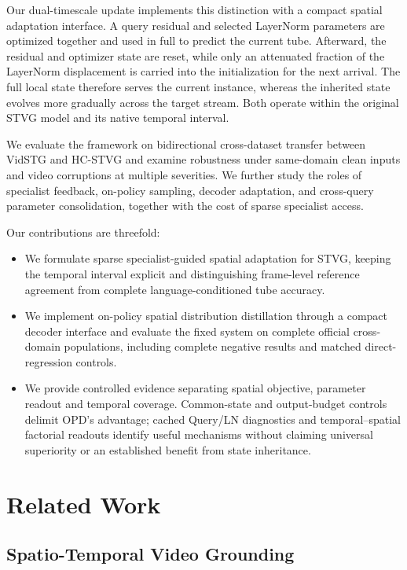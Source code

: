 \documentclass[10pt,twocolumn,letterpaper]{article}
\begin{document}
Our dual-timescale update implements this distinction with a compact
spatial adaptation interface. A query residual and selected LayerNorm
parameters are optimized together and used in full to predict the
current tube. Afterward, the residual and optimizer state are reset,
while only an attenuated fraction of the LayerNorm displacement is
carried into the initialization for the next arrival. The full local
state therefore serves the current instance, whereas the inherited
state evolves more gradually across the target stream. Both operate
within the original STVG model and its native temporal interval.

We evaluate the framework on bidirectional cross-dataset transfer
between VidSTG and HC-STVG and examine robustness under same-domain
clean inputs and video corruptions at multiple severities. We further
study the roles of specialist feedback, on-policy sampling, decoder
adaptation, and cross-query parameter consolidation, together with
the cost of sparse specialist access.

Our contributions are threefold:
\begin{itemize}
\item We formulate sparse specialist-guided spatial adaptation for STVG,
keeping the temporal interval explicit and distinguishing frame-level
reference agreement from complete language-conditioned tube accuracy.
\item We implement on-policy spatial distribution distillation through a
compact decoder interface and evaluate the fixed system on complete official
cross-domain populations, including complete negative results and matched
direct-regression controls.
\item We provide controlled evidence separating spatial objective, parameter
readout and temporal coverage. Common-state and output-budget controls delimit
OPD's advantage; cached Query/LN diagnostics and temporal--spatial factorial
readouts identify useful mechanisms without claiming universal superiority or
an established benefit from state inheritance.
\end{itemize}

\section{Related Work}
\label{sec:related-work}

\subsection{Spatio-Temporal Video Grounding}
\end{document}
